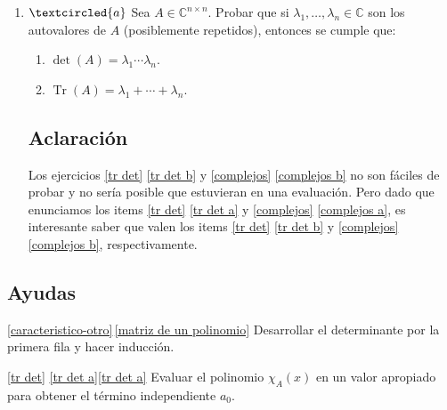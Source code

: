\begin{enumerate}[resume,topsep=6pt,itemsep=.4cm]
\item\label{complejos} $\textcircled{a}$  Sea $A\in\mathbb{C}^{n\times n}$. Probar que si $\lambda_1,\dots,\lambda_n \in \mathbb C$ son los autovalores de $A$
(posiblemente repetidos), entonces se cumple que:
\begin{enumerate}
    \item\label{complejos a} $\det(A)=\lambda_1\cdots \lambda_n$.
    \item\label{complejos b} $\operatorname{Tr}(A)=\lambda_1+\cdots+\lambda_n$.
\end{enumerate}

\subsection*{Aclaración}
Los ejercicios \ref{tr det}  \ref{tr det b} y \ref{complejos}  \ref{complejos b} no son fáciles de probar y no sería posible que estuvieran en una evaluación. Pero dado que enunciamos los items  \ref{tr det}  \ref{tr det a} y \ref{complejos}  \ref{complejos a}, es interesante saber que valen los items  \ref{tr det}  \ref{tr det b} y \ref{complejos}  \ref{complejos b}, respectivamente.
%
%

\end{enumerate}


\subsection*{Ayudas}

\ref{caracteristico-otro}\,\ref{matriz de un polinomio} Desarrollar el determinante por la primera fila y hacer inducción.


\ref{tr det} \ref{tr det a}\ref{tr det a} Evaluar el polinomio $\chi_A(x)$ en un valor apropiado para obtener el término independiente $a_0$.


